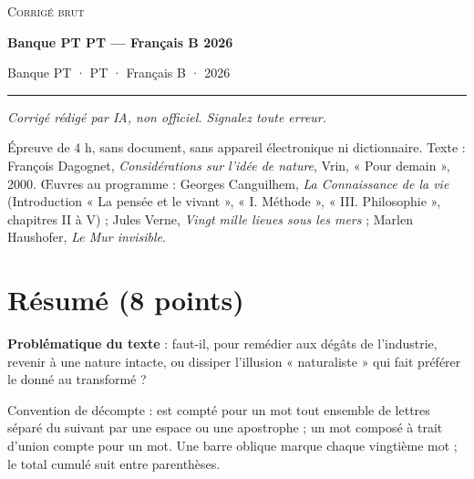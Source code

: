 \documentclass[11pt,a4paper]{article}
\begin{document}
\thispagestyle{plain}
\begin{center}
  {\small\scshape Corrigé brut}\par\smallskip
  {\LARGE\bfseries Banque PT PT — Français B 2026\par}\medskip
  {\large Banque PT · PT · Français B · 2026\par}
\end{center}
\vspace{2pt}\hrule\vspace{8pt}

\emph{Corrigé rédigé par IA, non officiel. Signalez toute erreur.}

Épreuve de 4 h, sans document, sans appareil électronique ni dictionnaire. Texte : François Dagognet, \emph{Considérations sur l'idée de nature}, Vrin, « Pour demain », 2000. Œuvres au programme : Georges Canguilhem, \emph{La Connaissance de la vie} (Introduction « La pensée et le vivant », « I. Méthode », « III. Philosophie », chapitres II à V) ; Jules Verne, \emph{Vingt mille lieues sous les mers} ; Marlen Haushofer, \emph{Le Mur invisible}.

\hypertarget{ruxe9sumuxe9-8-points}{%
\section{Résumé (8 points)}\label{ruxe9sumuxe9-8-points}}

\textbf{Problématique du texte} : faut-il, pour remédier aux dégâts de l'industrie, revenir à une nature intacte, ou dissiper l'illusion « naturaliste » qui fait préférer le donné au transformé ?

Convention de décompte : est compté pour un mot tout ensemble de lettres séparé du suivant par une espace ou une apostrophe ; un mot composé à trait d'union compte pour un mot. Une barre oblique marque chaque vingtième mot ; le total cumulé suit entre parenthèses.
\end{document}
